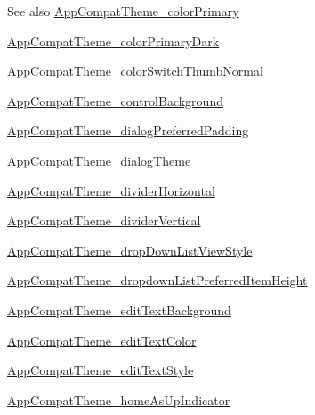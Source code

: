 \begin{DoxySeeAlso}{See also}
\hyperlink{classandroid_1_1support_1_1v7_1_1appcompat_1_1R_1_1styleable_a26d76193ccbedca9d0812bd6a9da153c}{App\+Compat\+Theme\+\_\+color\+Primary} 

\hyperlink{classandroid_1_1support_1_1v7_1_1appcompat_1_1R_1_1styleable_af91ab112f2b33d3628adc9f30b24ba98}{App\+Compat\+Theme\+\_\+color\+Primary\+Dark} 

\hyperlink{classandroid_1_1support_1_1v7_1_1appcompat_1_1R_1_1styleable_a879b8157b7dcefca9179aa3158069301}{App\+Compat\+Theme\+\_\+color\+Switch\+Thumb\+Normal} 

\hyperlink{classandroid_1_1support_1_1v7_1_1appcompat_1_1R_1_1styleable_adbd4cb3df33f5d9a2b7c946af26dee6c}{App\+Compat\+Theme\+\_\+control\+Background} 

\hyperlink{classandroid_1_1support_1_1v7_1_1appcompat_1_1R_1_1styleable_a2ec375fd86ae1937bc7084ae55cb13ac}{App\+Compat\+Theme\+\_\+dialog\+Preferred\+Padding} 

\hyperlink{classandroid_1_1support_1_1v7_1_1appcompat_1_1R_1_1styleable_a3b373a5641c2c0d185832eeac15143ef}{App\+Compat\+Theme\+\_\+dialog\+Theme} 

\hyperlink{classandroid_1_1support_1_1v7_1_1appcompat_1_1R_1_1styleable_a9f9eeb41cd04fde184cb1d33ff02ac4c}{App\+Compat\+Theme\+\_\+divider\+Horizontal} 

\hyperlink{classandroid_1_1support_1_1v7_1_1appcompat_1_1R_1_1styleable_a0229bd53423fdcafebbee737780714c3}{App\+Compat\+Theme\+\_\+divider\+Vertical} 

\hyperlink{classandroid_1_1support_1_1v7_1_1appcompat_1_1R_1_1styleable_a3da6d88b52409300bd0e52cd51d23b95}{App\+Compat\+Theme\+\_\+drop\+Down\+List\+View\+Style} 

\hyperlink{classandroid_1_1support_1_1v7_1_1appcompat_1_1R_1_1styleable_a64633ebcc361abc4bc0d98ec47d2ec0e}{App\+Compat\+Theme\+\_\+dropdown\+List\+Preferred\+Item\+Height} 

\hyperlink{classandroid_1_1support_1_1v7_1_1appcompat_1_1R_1_1styleable_afc8d2168bda3ebfc16b4e27ccdad5f98}{App\+Compat\+Theme\+\_\+edit\+Text\+Background} 

\hyperlink{classandroid_1_1support_1_1v7_1_1appcompat_1_1R_1_1styleable_a1e1c82a944abb501f53097bce7f50f0b}{App\+Compat\+Theme\+\_\+edit\+Text\+Color} 

\hyperlink{classandroid_1_1support_1_1v7_1_1appcompat_1_1R_1_1styleable_a61b6fb421253f208b594379481457a10}{App\+Compat\+Theme\+\_\+edit\+Text\+Style} 

\hyperlink{classandroid_1_1support_1_1v7_1_1appcompat_1_1R_1_1styleable_a64e8a50c8e529ef52de9d6160eec4331}{App\+Compat\+Theme\+\_\+home\+As\+Up\+Indicator} 


\end{DoxySeeAlso}
